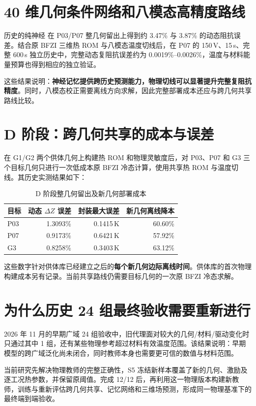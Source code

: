 \section{40 维几何条件网络和八模态高精度路线}
历史的纯神经  在 P03/P07 整几何留出上得到约 3.47\% 与 3.87\% 的动态阻抗误差。结合原 BFZI 三维热 ROM 与八模态温度切线后，在 P07 的 150\,V、15\,s、完整 600\,s 独立历史中，完整动态复阻抗误差约为 0.0019\%--0.0026\%，温度与材料能量预算也得到相应的独立验证。

这些结果说明：\textbf{神经记忆提供跨历史预测能力，物理切线可以显著提升完整复阻抗精度}。同时，八模态校正需要离线方向求解，因此完整部署成本还应与跨几何共享路线比较。

\section{D 阶段：跨几何共享的成本与误差}
在 G1/G2 两个供体几何上构建热 ROM 和物理灵敏度后，对 P03、P07 和 G3 三个目标几何只进行一次低成本原 BFZI 冷态计算，使用共享热 ROM 与温度切线。其历史实测结果如下：
\begin{table}[htbp]\centering\small
\caption{D 阶段整几何留出及新几何部署成本}
\begin{tabularx}{\textwidth}{lrrr}
\toprule
目标 & 动态 $\Delta Z$ 误差 & 封装最大误差 & 新几何离线降本\\
\midrule
P03 & 1.3093\% & 0.1415\,K & 60.60\%\\
P07 & 0.9173\% & 0.6421\,K & 57.92\%\\
G3 & 0.8258\% & 0.3403\,K & 63.12\%\\
\bottomrule
\end{tabularx}
\end{table}
这些数字针对供体库已经建立之后的\textbf{每个新几何边际离线时间}。供体库的首次物理构建成本另有记录。当前共享路线仍需要目标几何的一次原 BFZI 冷态求解。

\section{为什么历史 24 组最终验收需要重新进行}
2026 年 11 月的早期广域 24 组验收中，旧代理面对较大的几何/材料/驱动变化时只通过其中 1 组，还有某些物理参考超过材料有效温度范围。该结果说明：早期模型的跨广域泛化尚未闭合，同时教师本身也需要更可信的数值与材料范围。

当前研究先解决物理教师的完整正确性，S5 冻结新样本覆盖了新的几何、激励及逐工况热参数，并保留原阈值。完成 12/12 后，再利用这一物理版本构建新教师，训练与重新评估跨几何共享、记忆网络和三维场预测，形成同一物理基准下的最终端到端验收。

